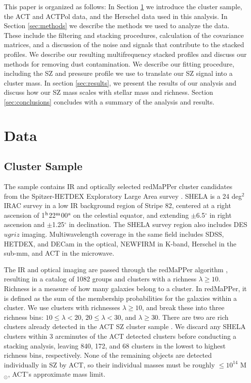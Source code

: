 \documentclass[a4paper,fleqn,usenatbib]{mnras}
\begin{document}
This paper is organized as follows: In Section \ref{sec:data} we introduce the cluster sample, the ACT and ACTPol data, and the Herschel data used in this analysis. In Section \ref{sec:methods} we describe the methods we used to analyze the data. These include the filtering and stacking procedures, calculation of the covariance matrices, and a discussion of the noise and signals that contribute to the stacked profiles. We describe our resulting multifrequency stacked profiles 
and discuss our methods for removing dust contamination. We describe our fitting procedure, including the SZ and pressure profile we use to translate our SZ signal into a cluster mass. In section \ref{sec:results}, we present the results of our analysis and discuss how our SZ mass scales with stellar mass and richness. Section \ref{sec:conclusions} concludes with a summary of the analysis and results.


\section{Data} \label{sec:data}

\subsection{Cluster Sample}
The sample contains IR and optically selected redMaPPer cluster candidates from the Spitzer-HETDEX Exploratory Large Area survey  \citep{2016ApJS..224...28P}. SHELA is a 24 deg$^2$ IRAC survey in a low IR background region of Stripe 82, centered at a right ascension of 1$^{\rm h}$22$^{\rm m}$00$^{\rm s}$ on the celestial equator, and extending $\pm$6.5$^{\circ}$ in right ascension and $\pm$1.25$^{\circ}$ in declination. The SHELA survey region also includes DES $ugriz$ imaging. Multiwavelength coverage in the same field includes SDSS, HETDEX, and DECam in the optical, NEWFIRM in K-band, Herschel in the sub-mm, and ACT in the microwave. 

The IR and optical imaging are passed through the redMaPPer algorithm \citep{2014ApJ...785..104R}, resulting in a catalog of 1082 groups and clusters with a richness $\lambda \geq 10.$ Richness is a measure of how many galaxies belong to a cluster. In redMaPPer, it is defined as the sum of the membership probabilities for the galaxies within a cluster. We use clusters with richnesses $\lambda \geq 10$, and break these into three richness bins: $10 \leq \lambda < 20$, $20 \leq \lambda < 30$, and $\lambda \geq 30$. There are two are rich clusters already detected in the ACT SZ cluster sample \citep{2013JCAP...07..008H}. We discard any SHELA clusters within 3 arcminutes of the ACT detected clusters before conducting a stacking analysis, leaving 840, 172, and 68 clusters in the lowest to highest richness bins, respectively. None of the remaining objects are detected individually in SZ by ACT, so their individual masses must be roughly $\leq 10^{14}$ M$_\odot$, ACT's approximate mass limit.
\end{document}
